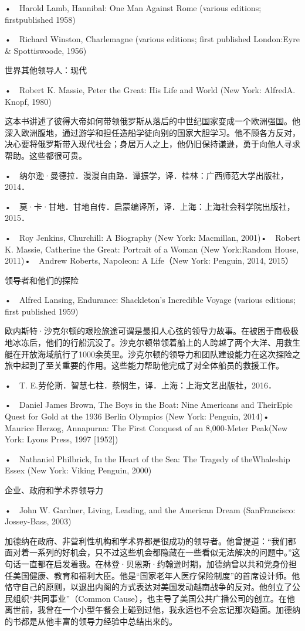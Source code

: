 •　Harold Lamb, Hannibal: One Man Against Rome (various editions; firstpublished 1958)

•　Richard Winston, Charlemagne (various editions; first published London:Eyre \& Spottiswoode, 1956)


世界其他领导人：现代

•　Robert K. Massie, Peter the Great: His Life and World (New York: AlfredA. Knopf, 1980)

这本书讲述了彼得大帝如何带领俄罗斯从落后的中世纪国家变成一个欧洲强国。他深入欧洲腹地，通过游学和担任造船学徒向别的国家大胆学习。他不顾各方反对，决心要将俄罗斯带入现代社会；身居万人之上，他仍旧保持谦逊，勇于向他人寻求帮助。这些都很可贵。

•　纳尔逊·曼德拉．漫漫自由路．谭振学，译．桂林：广西师范大学出版社，2014．

•　莫·卡·甘地．甘地自传．启蒙编译所，译．上海：上海社会科学院出版社，2015．

•　Roy Jenkins, Churchill: A Biography (New York: Macmillan, 2001)•　Robert K. Massie, Catherine the Great: Portrait of a Woman (New York:Random House, 2011)•　Andrew Roberts, Napoleon: A Life（New York: Penguin, 2014, 2015）


领导者和他们的探险

•　Alfred Lansing, Endurance: Shackleton’s Incredible Voyage (various editions; first published 1959)

欧内斯特·沙克尔顿的艰险旅途可谓是最扣人心弦的领导力故事。在被困于南极极地冰冻后，他们的行船沉没了。沙克尔顿带领着船上的人跨越了两个大洋、用救生艇在开放海域航行了1000余英里。沙克尔顿的领导力和团队建设能力在这次探险之旅中起到了至关重要的作用。这些能力帮助他完成了对全体船员的救援工作。

•　T. E.劳伦斯．智慧七柱．蔡悯生，译．上海：上海文艺出版社，2016．

•　Daniel James Brown, The Boys in the Boat: Nine Americans and TheirEpic Quest for Gold at the 1936 Berlin Olympics (New York: Penguin, 2014)•　Maurice Herzog, Annapurna: The First Conquest of an 8,000-Meter Peak(New York: Lyons Press, 1997 [1952])

•　Nathaniel Philbrick, In the Heart of the Sea: The Tragedy of theWhaleship Essex (New York: Viking Penguin, 2000)


企业、政府和学术界领导力

•　John W. Gardner, Living, Leading, and the American Dream (SanFrancisco: Jossey-Bass, 2003)

加德纳在政府、非营利性机构和学术界都是很成功的领导者。他曾提道：“我们都面对着一系列的好机会，只不过这些机会都隐藏在一些看似无法解决的问题中。”这句话一直都在启发着我。在林登·贝恩斯·约翰逊时期，加德纳曾以共和党身份担任美国健康、教育和福利大臣。他是“国家老年人医疗保险制度”的首席设计师。他恪守自己的原则，以退出内阁的方式表达对美国发动越南战争的反对。他创立了公民组织“共同事业”（Common Cause），也主导了美国公共广播公司的创立。在他离世前，我曾在一个小型午餐会上碰到过他，我永远也不会忘记那次碰面。加德纳的书都是从他丰富的领导力经验中总结出来的。

